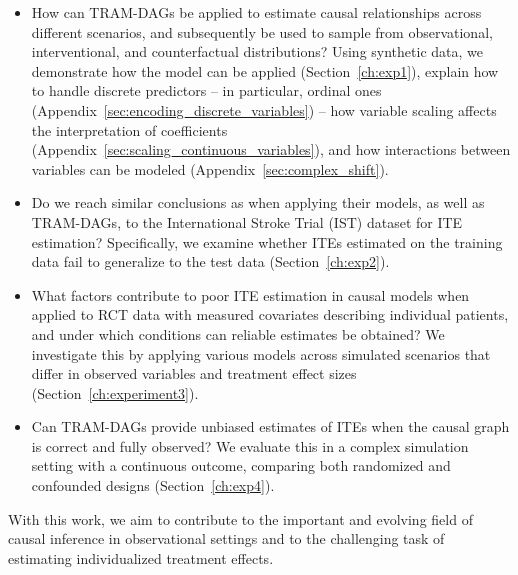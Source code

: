 \begin{itemize}

\item How can TRAM-DAGs be applied to estimate causal relationships across different scenarios, and subsequently be used to sample from observational, interventional, and counterfactual distributions? Using synthetic data, we demonstrate how the model can be applied (Section~\ref{ch:exp1}), explain how to handle discrete predictors -- in particular, ordinal ones (Appendix~\ref{sec:encoding_discrete_variables}) -- how variable scaling affects the interpretation of coefficients (Appendix~\ref{sec:scaling_continuous_variables}), and how interactions between variables can be modeled (Appendix~\ref{sec:complex_shift}).

    
    \item Do we reach similar conclusions as \citet{chen2025} when applying their models, as well as TRAM-DAGs, to the International Stroke Trial (IST) dataset for ITE estimation? Specifically, we examine whether ITEs estimated on the training data fail to generalize to the test data (Section~\ref{ch:exp2}).

    \item What factors contribute to poor ITE estimation in causal models when applied to RCT data with measured covariates describing individual patients, and under which conditions can reliable estimates be obtained? We investigate this by applying various models across simulated scenarios that differ in observed variables and treatment effect sizes (Section~\ref{ch:experiment3}).



    \item Can TRAM-DAGs provide unbiased estimates of ITEs when the causal graph is correct and fully observed? We evaluate this in a complex simulation setting with a continuous outcome, comparing both randomized and confounded designs (Section~\ref{ch:exp4}).
\end{itemize}




% 



With this work, we aim to contribute to the important and evolving field of causal inference in observational settings and to the challenging task of estimating individualized treatment effects.
